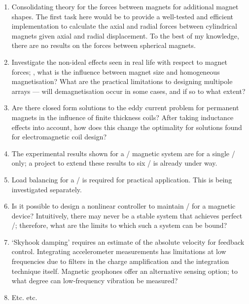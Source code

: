 \begin{enumerate}
\item
Consolidating theory for the forces between magnets for additional magnet shapes.
The first task here would be to provide a well-tested and efficient implementation to calculate the axial and radial forces between cylindrical magnets given axial and radial displacement.
To the best of my knowledge, there are no results on the forces between spherical magnets.

\item
Investigate the non-ideal effects seen in real life with respect to magnet forces; \eg, what is the influence between magnet size and homogeneous magnetisation?
What are the practical limitations to designing multipole arrays — will demagnetisation occur in some cases, and if so to what extent?

\item
Are there closed form solutions to the eddy current problem for permanent magnets in the influence of finite thickness coils?
After taking inductance effects into account, how does this change the optimality for solutions found for electromagnetic coil design?

\item
The experimental results shown for a \qzs/ magnetic system are for a single \dof/ only; a project to extend these results to six \dof/ is already under way.

\item
Load balancing for a \qzs/ is required for practical application.
This is being investigated separately.

\item
Is it possible to design a nonlinear controller to maintain \qzs/ for a magnetic device?
Intuitively, there may never be a stable system that achieves perfect \qzs/; therefore, what are the limits to which such a system can be bound?

\item
`Skyhook damping' requires an estimate of the absolute velocity for feedback control.
Integrating accelerometer measurements has limitations at low frequencies due to filters in the charge amplification and the integration technique itself.
Magnetic geophones offer an alternative sensing option; to what degree can low-frequency vibration be measured?

\item
Etc. etc.

\end{enumerate}

